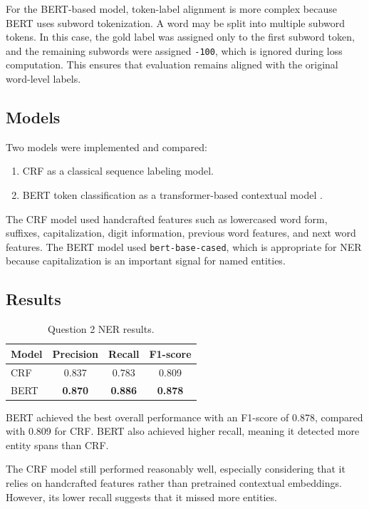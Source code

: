 \documentclass[11pt,a4paper]{article}
\begin{document}
For the BERT-based model, token-label alignment is more complex because BERT uses subword tokenization. A word may be split into multiple subword tokens. In this case, the gold label was assigned only to the first subword token, and the remaining subwords were assigned \texttt{-100}, which is ignored during loss computation. This ensures that evaluation remains aligned with the original word-level labels.

\subsection{Models}

Two models were implemented and compared:

\begin{enumerate}[leftmargin=*]
    \item CRF as a classical sequence labeling model.
    \item BERT token classification as a transformer-based contextual model \cite{devlin2019bert}.
\end{enumerate}

The CRF model used handcrafted features such as lowercased word form, suffixes, capitalization, digit information, previous word features, and next word features. The BERT model used \texttt{bert-base-cased}, which is appropriate for NER because capitalization is an important signal for named entities.

\subsection{Results}

\begin{table}[H]
\centering
\caption{Question 2 NER results.}
\begin{tabular}{lccc}
\toprule
Model & Precision & Recall & F1-score \\
\midrule
CRF & 0.837 & 0.783 & 0.809 \\
BERT & \textbf{0.870} & \textbf{0.886} & \textbf{0.878} \\
\bottomrule
\end{tabular}
\end{table}

BERT achieved the best overall performance with an F1-score of 0.878, compared with 0.809 for CRF. BERT also achieved higher recall, meaning it detected more entity spans than CRF.

The CRF model still performed reasonably well, especially considering that it relies on handcrafted features rather than pretrained contextual embeddings. However, its lower recall suggests that it missed more entities.
\end{document}
